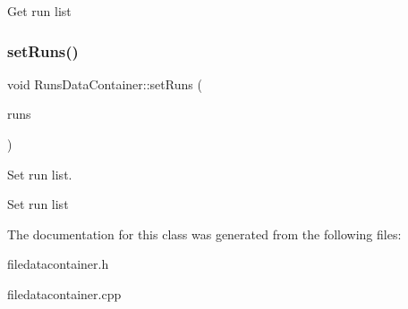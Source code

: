 Get run list \mbox{\label{classRunsDataContainer_a534b4bb8b49cdc4dc2b24521af3b17d8}} 
\subsubsection{\texorpdfstring{setRuns()}{setRuns()}}
{\footnotesize\ttfamily void Runs\+Data\+Container\+::set\+Runs (\begin{DoxyParamCaption}\item[{std\+::vector$<$ \mbox{\hyperlink{classRunDataContainer}{Run\+Data\+Container}} $>$}]{runs }\end{DoxyParamCaption})}



Set run list. 

Set run list 

The documentation for this class was generated from the following files\+:\begin{DoxyCompactItemize}
\item 
filedatacontainer.\+h\item 
filedatacontainer.\+cpp\end{DoxyCompactItemize}
